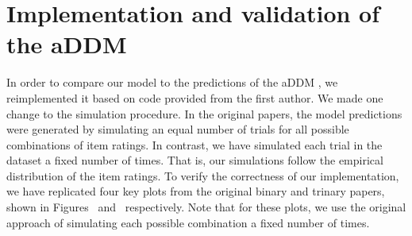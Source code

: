 \section{Implementation and validation of the aDDM}\label{app:attention-addm}


In order to compare our model to the predictions of the aDDM \citep{krajbich2010visual,krajbich2011multialternative}, we reimplemented it based on code provided from the first author. We made one change to the simulation procedure. In the original papers, the model predictions were generated by simulating an equal number of trials for all possible combinations of item ratings. In contrast, we have simulated each trial in the dataset a fixed number of times. That is, our simulations follow the empirical distribution of the item ratings. To verify the correctness of our implementation, we have replicated four key plots from the original binary and trinary papers, shown in Figures~ and~ respectively. Note that for these plots, we use the original approach of simulating each possible combination a fixed number of times.



